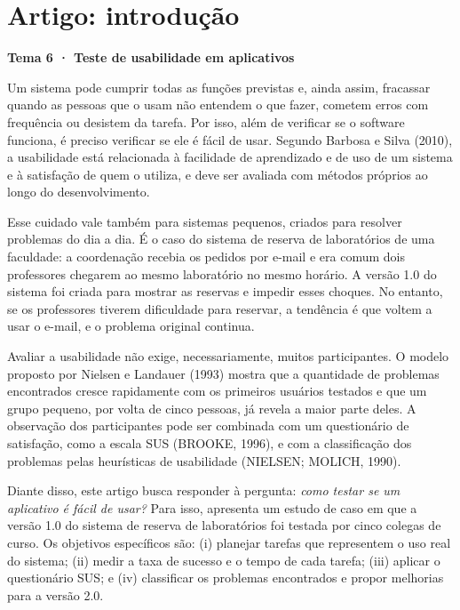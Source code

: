 \documentclass[a4paper,12pt]{article}
\begin{document}
\begin{center}
  
\end{center}

\section{Artigo: introdução}

\textbf{Tema 6 · Teste de usabilidade em aplicativos}

Um sistema pode cumprir todas as funções previstas e, ainda assim,
fracassar quando as pessoas que o usam não entendem o que fazer,
cometem erros com frequência ou desistem da tarefa. Por isso, além de
verificar se o software funciona, é preciso verificar se ele é fácil
de usar. Segundo Barbosa e Silva (2010), a usabilidade está relacionada
à facilidade de aprendizado e de uso de um sistema e à satisfação de
quem o utiliza, e deve ser avaliada com métodos próprios ao longo do
desenvolvimento.

Esse cuidado vale também para sistemas pequenos, criados para resolver
problemas do dia a dia. É o caso do sistema de reserva de laboratórios
de uma faculdade: a coordenação recebia os pedidos por e-mail e era
comum dois professores chegarem ao mesmo laboratório no mesmo horário.
A versão 1.0 do sistema foi criada para mostrar as reservas e impedir
esses choques. No entanto, se os professores tiverem dificuldade para
reservar, a tendência é que voltem a usar o e-mail, e o problema
original continua.

Avaliar a usabilidade não exige, necessariamente, muitos participantes.
O modelo proposto por Nielsen e Landauer (1993) mostra que a quantidade
de problemas encontrados cresce rapidamente com os primeiros usuários
testados e que um grupo pequeno, por volta de cinco pessoas, já revela
a maior parte deles. A observação dos participantes pode ser combinada
com um questionário de satisfação, como a escala SUS
(BROOKE, 1996), e com a classificação dos problemas pelas heurísticas
de usabilidade (NIELSEN; MOLICH, 1990).

Diante disso, este artigo busca responder à pergunta: \emph{como testar
se um aplicativo é fácil de usar?} Para isso, apresenta um estudo de
caso em que a versão 1.0 do sistema de reserva de laboratórios foi
testada por cinco colegas de curso. Os objetivos específicos são:
(i) planejar tarefas que representem o uso real do sistema;
(ii) medir a taxa de sucesso e o tempo de cada tarefa;
(iii) aplicar o questionário SUS; e
(iv) classificar os problemas encontrados e propor melhorias para a
versão 2.0.
\end{document}
